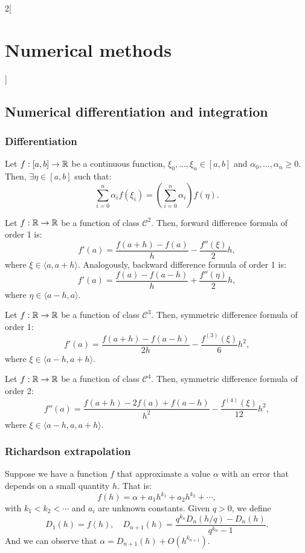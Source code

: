 \documentclass[../../../main.tex]{subfiles}
\begin{document}
\begin{multicols}{2}[\section{Numerical methods}]
\subsection{Numerical differentiation and integration}
\subsubsection*{Differentiation}
\begin{theorem}
    Let $f:[a,b]\rightarrow\mathbb{R}$ be a continuous function, $\xi_0,\ldots,\xi_n\in[a,b]$ and $\alpha_0,\ldots,\alpha_n\geq 0$. Then, $\exists\eta\in[a,b]$ such that: $$\sum_{i=0}^n\alpha_if(\xi_i)=\left(\sum_{i=0}^n\alpha_i\right)f(\eta).$$
\end{theorem}
\begin{theorem}
    Let $f:\mathbb{R}\rightarrow\mathbb{R}$ be a function of class $\mathcal{C}^2$. Then, forward difference formula of order 1 is: $$f'(a)=\frac{f(a+h)-f(a)}{h}-\frac{f''(\xi)}{2}h,$$ where $\xi\in\langle a,a+h\rangle$. Analogously, backward difference formula of order 1 is: $$f'(a)=\frac{f(a)-f(a-h)}{h}+\frac{f''(\eta)}{2}h,$$ where $\eta\in\langle a-h,a\rangle$.
\end{theorem}
\begin{theorem}
    Let $f:\mathbb{R}\rightarrow\mathbb{R}$ be a function of class $\mathcal{C}^3$. Then, symmetric difference formula of order 1: $$f'(a)=\frac{f(a+h)-f(a-h)}{2h}-\frac{f^{(3)}(\xi)}{6}h^2,$$ where $\xi\in\langle a-h,a+h\rangle$.
\end{theorem}
\begin{theorem}
    Let $f:\mathbb{R}\rightarrow\mathbb{R}$ be a function of class $\mathcal{C}^4$. Then, symmetric difference formula of order 2: $$f''(a)=\frac{f(a+h)-2f(a)+f(a-h)}{h^2}-\frac{f^{(4)}(\xi)}{12}h^2,$$ where $\xi\in\langle a-h,a,a+h\rangle$.
\end{theorem}
\subsubsection*{Richardson extrapolation}
\begin{theorem}
    Suppose we have a function $f$ that approximate a value $\alpha$ with an error that depends on a small quantity $h$. That is: $$f(h)=\alpha+a_1h^{k_1}+a_2h^{k_2}+\cdots,$$with $k_1<k_2<\cdots$ and $a_i$ are unknown constants. Given $q>0$, we define $$D_1(h)=f(h),\quad D_{n+1}(h)=\frac{q^{k_n}D_n\left(h/q\right)-D_n(h)}{q^{k_n}-1}.$$ And we can observe that $\alpha=D_{n+1}(h)+O(h^{k_{n+1}})$.
\end{theorem}

\end{multicols}
\end{document}
